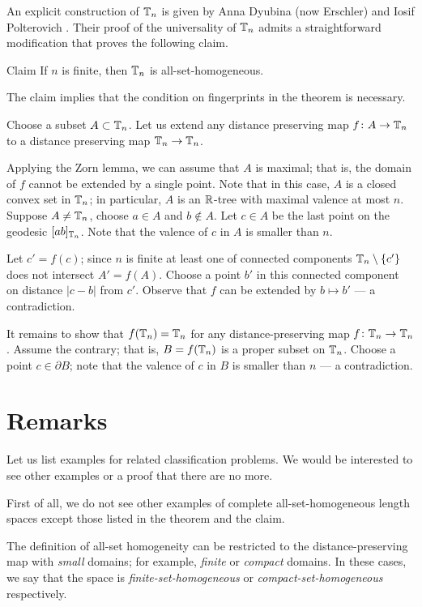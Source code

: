 \documentclass[a4paper,10pt]{article}
\begin{document}
An explicit construction of $\mathbb{T}_n$ is given by Anna Dyubina (now Erschler) and Iosif Polterovich \cite{dyubina-polterovich}.
Their proof of the universality of $\mathbb{T}_n$ admits a straightforward modification that proves the following claim. 

\begin{thm}{Claim}
If $n$ is finite, then $\mathbb{T}_n$ is all-set-homogeneous.
\end{thm}

The claim implies that the condition on fingerprints in the theorem is necessary.

Choose a subset $A\subset \mathbb{T}_n$. 
Let us extend any distance preserving map $f\colon A\to \mathbb{T}_n$ to a distance preserving map $\mathbb{T}_n\to \mathbb{T}_n$.

Applying the Zorn lemma, we can assume that $A$ is maximal; that is, the domain of $f$ cannot be extended by a single point.
Note that in this case, $A$ is a closed convex set in $\mathbb{T}_n$; in particular, $A$ is an $\mathbb{R}$-tree with maximal valence at most $n$.
Suppose $A\ne \mathbb{T}_n$, choose $a\in A$ and $b\notin A$. 
Let $c\in A$ be the last point on the geodesic $[ab]_{\mathbb{T}_n}$.
Note that the valence of $c$ in $A$ is smaller than $n$.

Let $c'=f(c)$; since $n$ is finite at least one of connected components $\mathbb{T}_n\setminus \{c'\}$ does not intersect $A'=f(A)$.
Choose a point $b'$ in this connected component on distance $|c-b|$ from $c'$.
Observe that $f$ can be extended by $b\mapsto b'$ --- a contradiction.

It remains to show that $f(\mathbb{T}_n)=\mathbb{T}_n$ for any distance-preserving map $f\:\TT_n\z\to \TT_n$.
Assume the contrary; that is, $B=f(\mathbb{T}_n)$ is a proper subset on $\mathbb{T}_n$.
Choose a point $c\in \partial B$; note that the valence of $c$ in $B$ is smaller than $n$ --- a contradiction.
\qeds

\section{Remarks}


Let us list examples for related classification problems.
We would be interested to see other examples or a proof that there are no more. 

First of all, we do not see other examples of complete all-set-homogeneous length spaces except those listed in the theorem and the claim.

The definition of all-set homogeneity can be restricted to the distance-preserving map with \emph{small} domains; for example, \emph{finite} or \emph{compact} domains.
In these cases, we say that the space is \emph{finite-set-homogeneous} or \emph{compact-set-homogeneous} respectively.
\end{document}
